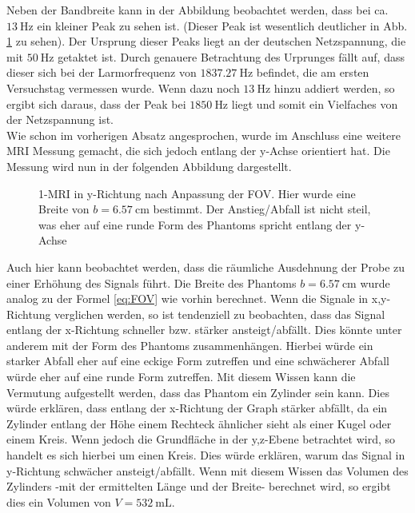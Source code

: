 Neben der Bandbreite kann in der Abbildung beobachtet werden, dass bei ca. $\SI{13}{\hertz}$ ein kleiner Peak zu sehen ist. (Dieser Peak ist wesentlich deutlicher in Abb. \ref{fig:1Dy} zu sehen). Der Ursprung dieser Peaks liegt an der deutschen Netzspannung, die mit $\SI{50}{\hertz}$ getaktet ist. Durch genauere Betrachtung des Urprunges fällt auf, dass dieser sich bei der Larmorfrequenz von $\SI{1837,27}{\hertz}$ befindet, die am ersten Versuchstag vermessen wurde. Wenn dazu noch $\SI{13}{\hertz}$ hinzu addiert werden, so  ergibt sich daraus, dass der Peak bei $\SI{1850}{\hertz}$ liegt und somit ein Vielfaches von der Netzspannung ist.\\
Wie schon im vorherigen Absatz angesprochen, wurde im Anschluss eine weitere MRI Messung gemacht, die sich jedoch entlang der y-Achse orientiert hat. Die Messung wird nun in der folgenden Abbildung dargestellt.
\begin{figure}[H]
    \centering
    
    \caption[1-MRI in y-Richtung nach Anpassung der FOV]{1-MRI in y-Richtung nach Anpassung der FOV. Hier wurde eine Breite von $b=\SI{6,57}{\centi \m}$ bestimmt. Der Anstieg/Abfall ist nicht steil, was eher auf eine runde Form des Phantoms spricht entlang der y-Achse}\label{fig:1Dy}
\end{figure} 
Auch hier kann beobachtet werden, dass die räumliche Ausdehnung der Probe zu einer Erhöhung des Signals führt. Die Breite des Phantoms $b=\SI{6,57}{\centi \m}$ wurde analog zu der Formel \ref{eq:FOV} wie vorhin berechnet. Wenn die Signale in x,y-Richtung verglichen werden, so ist tendenziell zu beobachten, dass das Signal entlang der x-Richtung schneller bzw. stärker ansteigt/abfällt. Dies könnte unter anderem mit der Form des Phantoms zusammenhängen. Hierbei würde ein starker Abfall eher auf eine eckige Form zutreffen und eine schwächerer Abfall würde eher auf eine runde Form zutreffen. Mit diesem Wissen kann die Vermutung aufgestellt werden, dass das Phantom ein Zylinder sein kann. Dies würde erklären, dass entlang der x-Richtung der Graph stärker abfällt, da ein Zylinder entlang der Höhe einem Rechteck ähnlicher sieht als einer Kugel oder einem Kreis. Wenn jedoch die Grundfläche in der y,z-Ebene betrachtet wird, so handelt es sich hierbei um einen Kreis. Dies würde erklären, warum das Signal in y-Richtung schwächer ansteigt/abfällt. Wenn mit diesem Wissen das Volumen des Zylinders -mit der ermittelten Länge und der Breite- berechnet wird, so ergibt dies ein Volumen von $V=\SI{532}{\milli\liter}$.\\
